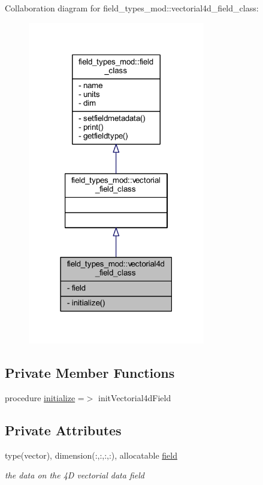 Collaboration diagram for field\+\_\+types\+\_\+mod\+:\+:vectorial4d\+\_\+field\+\_\+class\+:
\nopagebreak
\begin{figure}[H]
\begin{center}
\leavevmode
\includegraphics[width=219pt]{structfield__types__mod_1_1vectorial4d__field__class__coll__graph}
\end{center}
\end{figure}
\subsection*{Private Member Functions}
\begin{DoxyCompactItemize}
\item 
procedure \mbox{\hyperlink{structfield__types__mod_1_1vectorial4d__field__class_a5a6444cceeb9c973c2a44b28fa57b06f}{initialize}} =$>$ init\+Vectorial4d\+Field
\end{DoxyCompactItemize}
\subsection*{Private Attributes}
\begin{DoxyCompactItemize}
\item 
type(vector), dimension(\+:,\+:,\+:,\+:), allocatable \mbox{\hyperlink{structfield__types__mod_1_1vectorial4d__field__class_af6bfcd2fc8d810cedd160e3ade52698f}{field}}
\begin{DoxyCompactList}\small\item\em the data on the 4D vectorial data field \end{DoxyCompactList}\end{DoxyCompactItemize}


